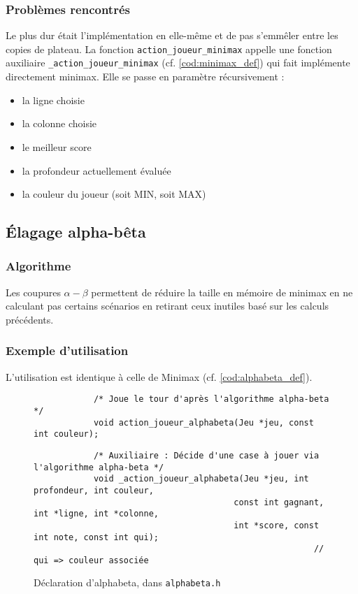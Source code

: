 \documentclass{article}
\begin{document}
\newpage
\subsubsection{Problèmes rencontrés}
Le plus dur était l'implémentation en elle-même et de pas s'emmêler entre les copies
de plateau. La fonction \texttt{action\_joueur\_minimax} appelle une fonction auxiliaire
\texttt{\_action\_joueur\_minimax} (cf. \autoref{cod:minimax_def}) qui fait implémente directement minimax. Elle se passe
en paramètre récursivement :
\begin{itemize}
    \item la ligne choisie
    \item la colonne choisie
    \item le meilleur score
    \item la profondeur actuellement évaluée
    \item la couleur du joueur (soit MIN, soit MAX)
\end{itemize}

\subsection[Alpha-Bêta]{Élagage alpha-bêta}
\subsubsection{Algorithme}
Les coupures $\alpha - \beta$ permettent de réduire la taille en mémoire de minimax
en ne calculant pas certains scénarios en retirant ceux inutiles basé sur
les calculs précédents.

\subsubsection{Exemple d'utilisation}
L'utilisation est identique à celle de Minimax (cf. \autoref{cod:alphabeta_def}).
\begin{figure}[h]
    \centering
    \begin{minipage}{0.8\textwidth}
        \begin{verbatim}
            /* Joue le tour d'après l'algorithme alpha-beta */
            void action_joueur_alphabeta(Jeu *jeu, const int couleur);
        \end{verbatim}

        \begin{verbatim}
            /* Auxiliaire : Décide d'une case à jouer via l'algorithme alpha-beta */
            void _action_joueur_alphabeta(Jeu *jeu, int profondeur, int couleur,
                                        const int gagnant, int *ligne, int *colonne,
                                        int *score, const int note, const int qui);
                                                        // qui => couleur associée
        \end{verbatim}
    \end{minipage}
    \caption{Déclaration d'alphabeta, dans \texttt{alphabeta.h}}
    \label{cod:alphabeta_def}
\end{figure}
\end{document}
